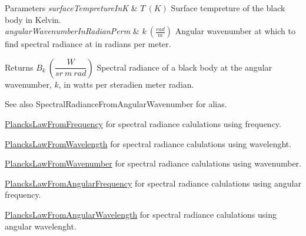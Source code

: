 \begin{DoxyParams}{Parameters}
{\em surface\+Tempreture\+InK} & $T\ (K)$ Surface tempreture of the black body in Kelvin. \\
\hline
{\em angular\+Wavenumber\+In\+Radian\+Perm} & $k\ (\frac{rad}{m})$ Angular wavenumber at which to find spectral radiance at in radians per meter. \\
\hline
\end{DoxyParams}
\begin{DoxyReturn}{Returns}
$B_{k}\ ( \dfrac{W}{sr\ m\ rad})$ Spectral radiance of a black body at the angular wavenumber, $k$, in watts per steradien meter radian. 
\end{DoxyReturn}
\begin{DoxySeeAlso}{See also}
Spectral\+Radiance\+From\+Angular\+Wavenumber for alias. 

\mbox{\hyperlink{group___e_g_x_phys-_electrodynamics-_black_body-_plancks_law_ga68aae82f8a086831358c4a61c8c80ba4}{Plancks\+Law\+From\+Frequency}} for spectral radiance calulations using frequency. 

\mbox{\hyperlink{group___e_g_x_phys-_electrodynamics-_black_body-_plancks_law_ga54639bc031ded51ef78aa82b0457a4dd}{Plancks\+Law\+From\+Wavelength}} for spectral radiance calulations using wavelenght. 

\mbox{\hyperlink{group___e_g_x_phys-_electrodynamics-_black_body-_plancks_law_ga6648ae2a0fbff6735c1e1a04c7cac746}{Plancks\+Law\+From\+Wavenumber}} for spectral radiance calulations using wavenumber. 

\mbox{\hyperlink{group___e_g_x_phys-_electrodynamics-_black_body-_plancks_law_gaac540560c71e30c02b91d22e417b5863}{Plancks\+Law\+From\+Angular\+Frequency}} for spectral radiance calulations using angular frequency. 

\mbox{\hyperlink{group___e_g_x_phys-_electrodynamics-_black_body-_plancks_law_ga7322124727f968d28807e918c5eeb23f}{Plancks\+Law\+From\+Angular\+Wavelength}} for spectral radiance calulations using angular wavelenght. 
\end{DoxySeeAlso}
\mbox{\label{group___e_g_x_phys-_electrodynamics-_black_body-_plancks_law_ga68aae82f8a086831358c4a61c8c80ba4}} 
